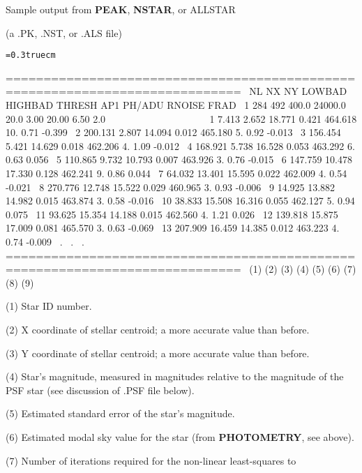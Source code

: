 \centerline{Sample output from {\bf PEAK}, {\bf NSTAR}, or ALLSTAR}
\centerline {(a .PK, .NST, or .ALS file)}
\bigskip
{\noindent\obeylines\obeyspaces\frenchspacing\tt\baselineskip=0.3truecm

=============================================================================
\ NL   NX   NY  LOWBAD HIGHBAD  THRESH     AP1  PH/ADU  RNOISE    FRAD
\  1  284  492   400.0 24000.0    20.0    3.00   20.00    6.50     2.0
~~~~~~~~~~~~~~~~~~~
\    1    7.413    2.652   18.771    0.421  464.618      10.     0.71   -0.399
\    2  200.131    2.807   14.094    0.012  465.180       5.     0.92   -0.013
\    3  156.454    5.421   14.629    0.018  462.206       4.     1.09   -0.012
\    4  168.921    5.738   16.528    0.053  463.292       6.     0.63    0.056
\    5  110.865    9.732   10.793    0.007  463.926       3.     0.76   -0.015
\    6  147.759   10.478   17.330    0.128  462.241       9.     0.86    0.044
\    7   64.032   13.401   15.595    0.022  462.009       4.     0.54   -0.021
\    8  270.776   12.748   15.522    0.029  460.965       3.     0.93   -0.006
\    9   14.925   13.882   14.982    0.015  463.874       3.     0.58   -0.016
\   10   38.833   15.508   16.316    0.055  462.127       5.     0.94    0.075
\   11   93.625   15.354   14.188    0.015  462.560       4.     1.21    0.026
\   12  139.818   15.875   17.009    0.081  465.570       3.     0.63   -0.069
\   13  207.909   16.459   14.385    0.012  463.223       4.     0.74   -0.009
\                                       .
\                                       .
\                                       .
=============================================================================
\   (1)    (2)      (3)      (4)      (5)     (6)        (7)     (8)      (9)
}
\item{(1)} Star ID number.
\item{(2)} X coordinate of stellar centroid; a more accurate value than before.
\item{(3)} Y coordinate of stellar centroid; a more accurate value than before.
\item{(4)} Star's magnitude, measured in magnitudes relative to the magnitude
of the PSF star (see discussion of .PSF file below).
\item{(5)} Estimated standard error of the star's magnitude.
\item{(6)} Estimated modal sky value for the star (from {\bf PHOTOMETRY},
see above).
\item{(7)} Number of iterations required for the non-linear least-squares to
